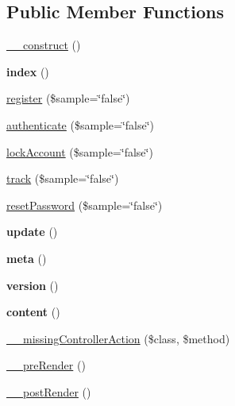 \subsection*{Public Member Functions}
\begin{DoxyCompactItemize}
\item 
\hyperlink{class_api_controller_a095c5d389db211932136b53f25f39685}{\_\-\_\-construct} ()
\item 
\hypertarget{class_api_controller_a149eb92716c1084a935e04a8d95f7347}{
{\bfseries index} ()}
\label{class_api_controller_a149eb92716c1084a935e04a8d95f7347}

\item 
\hyperlink{class_api_controller_a3810c4bd94eae6606db54e7280f02970}{register} (\$sample=\char`\"{}false\char`\"{})
\item 
\hyperlink{class_api_controller_a0c138aa6d520cff985b7aa31b7203c7d}{authenticate} (\$sample=\char`\"{}false\char`\"{})
\item 
\hyperlink{class_api_controller_a75475c6d605bc209adaef959b7d6d1a7}{lockAccount} (\$sample=\char`\"{}false\char`\"{})
\item 
\hyperlink{class_api_controller_a745716934f771441dfb5d01e946cc67d}{track} (\$sample=\char`\"{}false\char`\"{})
\item 
\hyperlink{class_api_controller_aaf34ade12e1f9e6cb6dda15ae666edfe}{resetPassword} (\$sample=\char`\"{}false\char`\"{})
\item 
\hypertarget{class_api_controller_a842e4774e3b3601a005b995c02f7e883}{
{\bfseries update} ()}
\label{class_api_controller_a842e4774e3b3601a005b995c02f7e883}

\item 
\hypertarget{class_api_controller_abaeb6516bfbfec3ca6cd440853925b68}{
{\bfseries meta} ()}
\label{class_api_controller_abaeb6516bfbfec3ca6cd440853925b68}

\item 
\hypertarget{class_api_controller_a6080dae0886626b9a4cedb29240708b1}{
{\bfseries version} ()}
\label{class_api_controller_a6080dae0886626b9a4cedb29240708b1}

\item 
\hypertarget{class_api_controller_a9b80bb36f89498eac4f43bf08461240d}{
{\bfseries content} ()}
\label{class_api_controller_a9b80bb36f89498eac4f43bf08461240d}

\item 
\hyperlink{class_controller_a728c573e418d1f979340a4669524cacd}{\_\-\_\-missingControllerAction} (\$class, \$method)
\item 
\hyperlink{class_controller_ad86994d2463ea27cab892176e6509bdb}{\_\-\_\-preRender} ()
\item 
\hyperlink{class_controller_adc3c9cc4788f7ba7d1368fdc43568b1d}{\_\-\_\-postRender} ()
\end{DoxyCompactItemize}
